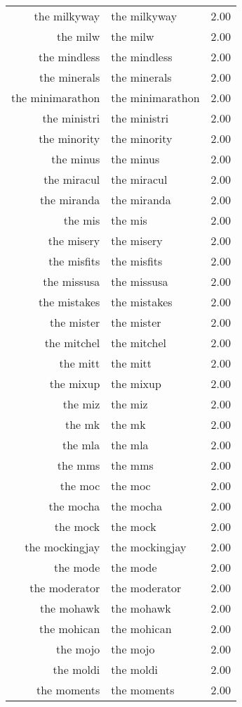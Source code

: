 \begin{table}[ht]
\begin{tabular}{rlr}
  the milkyway & the milkyway & 2.00 \\ 
  the milw & the milw & 2.00 \\ 
  the mindless & the mindless & 2.00 \\ 
  the minerals & the minerals & 2.00 \\ 
  the minimarathon & the minimarathon & 2.00 \\ 
  the ministri & the ministri & 2.00 \\ 
  the minority & the minority & 2.00 \\ 
  the minus & the minus & 2.00 \\ 
  the miracul & the miracul & 2.00 \\ 
  the miranda & the miranda & 2.00 \\ 
  the mis & the mis & 2.00 \\ 
  the misery & the misery & 2.00 \\ 
  the misfits & the misfits & 2.00 \\ 
  the missusa & the missusa & 2.00 \\ 
  the mistakes & the mistakes & 2.00 \\ 
  the mister & the mister & 2.00 \\ 
  the mitchel & the mitchel & 2.00 \\ 
  the mitt & the mitt & 2.00 \\ 
  the mixup & the mixup & 2.00 \\ 
  the miz & the miz & 2.00 \\ 
  the mk & the mk & 2.00 \\ 
  the mla & the mla & 2.00 \\ 
  the mms & the mms & 2.00 \\ 
  the moc & the moc & 2.00 \\ 
  the mocha & the mocha & 2.00 \\ 
  the mock & the mock & 2.00 \\ 
  the mockingjay & the mockingjay & 2.00 \\ 
  the mode & the mode & 2.00 \\ 
  the moderator & the moderator & 2.00 \\ 
  the mohawk & the mohawk & 2.00 \\ 
  the mohican & the mohican & 2.00 \\ 
  the mojo & the mojo & 2.00 \\ 
  the moldi & the moldi & 2.00 \\ 
  the moments & the moments & 2.00 \\ 

\end{tabular}
\end{table}
